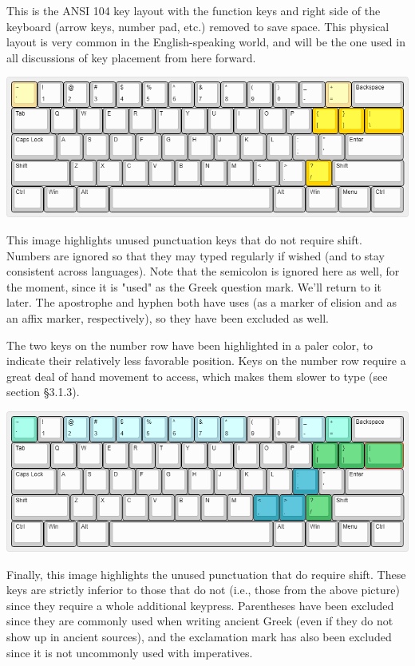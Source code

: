 \documentclass[11pt]{article}
\begin{document}
This is the ANSI 104 key layout with the function keys and right side of the keyboard (arrow keys, number pad, etc.) removed to save space. This physical layout is very common in the English-speaking world, and will be the one used in all discussions of key placement from here forward.

\begin{center}
\includegraphics[width=.9\linewidth]{./images/unused-no-shift.png}
\end{center}

This image highlights unused punctuation keys that do not require shift. Numbers are ignored so that they may typed regularly if wished (and to stay consistent across languages). Note that the semicolon is ignored here as well, for the moment, since it is "used" as the Greek question mark. We'll return to it later. The apostrophe and hyphen both have uses (as a marker of elision and as an affix marker, respectively), so they have been excluded as well.

The two keys on the number row have been highlighted in a paler color, to indicate their relatively less favorable position. Keys on the number row require a great deal of hand movement to access, which makes them slower to type (see section §3.1.3).

\begin{center}
\includegraphics[width=.9\linewidth]{./images/unused-shift.png}
\end{center}

Finally, this image highlights the unused punctuation that do require shift. These keys are strictly inferior to those that do not (i.e., those from the above picture) since they require a whole additional keypress. Parentheses have been excluded since they are commonly used when writing ancient Greek (even if they do not show up in ancient sources), and the exclamation mark has also been excluded since it is not uncommonly used with imperatives.
\end{document}
